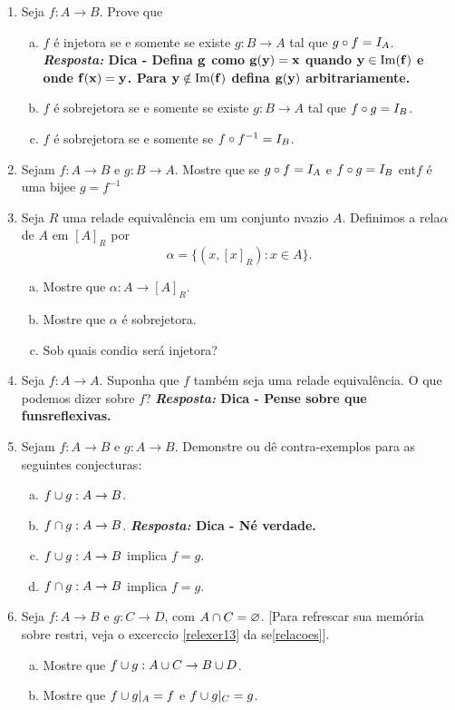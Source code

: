 \begin{enumerate}[{\bf 1.}]
\item Seja $f:A\to B$. Prove que
\begin{enumerate}[a)]
\item $f$ \'e injetora se e somente se existe $g:B\to A$ tal que $g\circ f=I_A$.
{\bf{\it Resposta:} Dica - Defina ${\bf g}$ como ${\bf g(y)=x}$ quando ${\bf y\in \operatorname{Im}(f)}$ e onde ${\bf f(x)=y}$. Para ${\bf y\notin \operatorname{Im}(f)}$ defina ${\bf g(y)}$ arbitrariamente.}

\item $f$ \'e sobrejetora se e somente se existe $g:B\to A$ tal que $f\circ g=I_B$.
\item $f$ \'e sobrejetora se e somente se $f\circ f^{-1}=I_B$.
\end{enumerate}

\item Sejam $f:A\to B$ e $g:B\to A$. Mostre que se $g\circ f=I_A$ e $f\circ g=I_B$ ent\ao $f$ \'e uma bije\cao e $g=f^{-1}$

\item Seja $R$ uma rela\cao de equival\^encia em um conjunto n\ao vazio $A$. Definimos a rela\cao $\alpha$ de $A$ em $[A]_R$ por
\[
\alpha=\{(x,[x]_R): x\in A\}.
\]
\begin{enumerate}[a)]
\item Mostre que $\alpha:A\to [A]_R$.
\item Mostre que $\alpha$ \'e sobrejetora.
\item Sob quais condi\coes $\alpha$ ser\'a injetora?
\end{enumerate}

\item Seja $f:A\to A$. Suponha que $f$ tamb\'em seja uma rela\cao de equival\^encia. O que podemos dizer sobre $f$? 
{\bf{\it Resposta:} Dica - Pense sobre que fun\coes s\ao reflexivas.}

\item Sejam $f:A\to B$ e $g:A\to B$. Demonstre ou d\^e contra-exemplos para as seguintes conjecturas:
\begin{enumerate}[a)]
\item $f\cup g:A\to B$.
\item $f\cap g:A\to B$. {\bf{\it Resposta:} Dica - N\ao \'e verdade.}
\item $f\cup g:A\to B$ implica $f=g$.
\item $f\cap g:A\to B$ implica $f=g$.
\end{enumerate}

\item Seja $f:A\to B$ e $g:C\to D$, com $A\cap C=\varnothing$. [Para refrescar sua mem\'oria sobre restri\cois, veja o excerc\ih cio \ref{relexer13} da se\cao \ref{relacoes}]. 
\begin{enumerate}[a)]
\item Mostre que $f\cup g:A\cup C\to B\cup D$.
\item Mostre que $f\cup g|_A=f$ e $f\cup g|_C=g$. 
\end{enumerate}


\end{enumerate}
